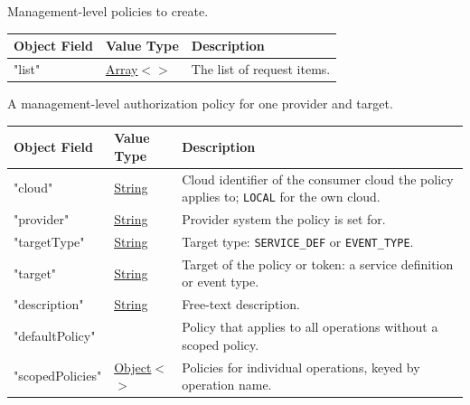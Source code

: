 \documentclass[a4paper]{arrowhead}
\newcommand{\mref}[2][]{{\textcolor{ArrowheadPurple}{\hyperref[sec:model:#2]{\ifstrempty{#1}{#2}{#1}}}}}
\newcommand{\pref}[1]{{\textcolor{ArrowheadGrey}{\hyperref[sec:model:primitives:#1]{#1}}}}
\begin{document}

Management-level policies to create.


\noindent\begin{tabularx}{\textwidth}{| >{\raggedright\arraybackslash}p{3.9cm} | >{\raggedright\arraybackslash\small}p{5.3cm} | X |} \hline
\rowcolor{gray!33} Object Field & Value Type & Description \\ \hline
"list" & \pref{Array}$<$\allowbreak{}\mref[Authorization\allowbreak{}Mgmt\allowbreak{}Grant\allowbreak{}Request]{AuthorizationMgmtGrantRequest}$>$ & The list of request items. \\ \hline
\end{tabularx}




A management-level authorization policy for one provider and target.


\noindent\begin{tabularx}{\textwidth}{| >{\raggedright\arraybackslash}p{3.9cm} | >{\raggedright\arraybackslash\small}p{5.3cm} | X |} \hline
\rowcolor{gray!33} Object Field & Value Type & Description \\ \hline
"cloud" & \pref{String} & Cloud identifier of the consumer cloud the policy applies to; \texttt{LOCAL} for the own cloud. \\ \hline
"provider" & \pref{String} & Provider system the policy is set for. \\ \hline
"target\allowbreak{}Type" & \pref{String} & Target type: \texttt{SERVICE\_\allowbreak{}DEF} or \texttt{EVENT\_\allowbreak{}TYPE}. \\ \hline
"target" & \pref{String} & Target of the policy or token: a service definition or event type. \\ \hline
"description" & \pref{String} & Free-text description. \\ \hline
"default\allowbreak{}Policy" & \mref[Authorization\allowbreak{}Policy\allowbreak{}Request]{AuthorizationPolicyRequest} & Policy that applies to all operations without a scoped policy. \\ \hline
"scoped\allowbreak{}Policies" & \pref{Object}$<$\allowbreak{}\mref[Authorization\allowbreak{}Policy\allowbreak{}Request]{AuthorizationPolicyRequest}$>$ & Policies for individual operations, keyed by operation name. \\ \hline
\end{tabularx}
\end{document}
